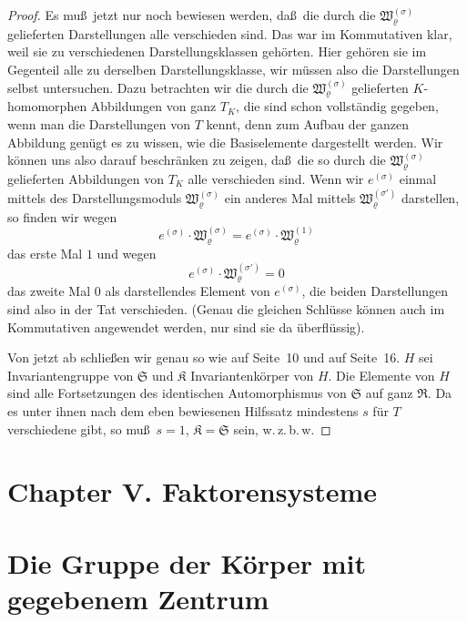 \documentclass[12pt,a4paper]{article}
\theoremstyle{plain}
\theoremstyle{definition}
\theoremstyle{remark}
\newcommand{\wzbw}{w.\,z.\,b.\,w.}
\begin{document}
\begin{proof}
Es mu\ss\ jetzt nur noch bewiesen werden, da\ss\ die durch die $\mathfrak{W}_{\varrho}^{(\sigma)}$
gelieferten Darstellungen alle verschieden sind. Das war im Kommutativen klar,
weil sie zu verschiedenen Darstellungsklassen geh\"orten. Hier geh\"oren sie im
Gegenteil alle zu derselben Darstellungsklasse, wir m\"ussen also die
Darstellungen selbst untersuchen. Dazu betrachten wir die durch die
$\mathfrak{W}_{\varrho}^{(\sigma)}$ gelieferten $K$-homomorphen Abbildungen von ganz $T_{K}$, die sind
schon vollst\"andig gegeben, wenn man die Darstellungen von $T$ kennt, denn zum
Aufbau der ganzen Abbildung gen\"ugt es zu wissen, wie die Basiselemente
dargestellt werden. Wir k\"onnen uns also darauf beschr\"anken zu zeigen, da\ss\ die
so durch die $\mathfrak{W}_{\varrho}^{(\sigma)}$ gelieferten Abbildungen von $T_{K}$ alle verschieden
sind. Wenn wir $e^{(\sigma)}$ einmal mittels des Darstellungsmoduls
$\mathfrak{W}_{\varrho}^{(\sigma)}$ ein anderes Mal mittels $\mathfrak{W}_{\varrho}^{(\sigma')}$ darstellen, so finden wir
wegen
\[
e^{(\sigma)} \cdot \mathfrak{W}_{\varrho}^{(\sigma)} = e^{(\sigma)} \cdot \mathfrak{W}_{\varrho}^{(1)}
\]
das erste Mal $1$ und wegen
\[
e^{(\sigma)} \cdot \mathfrak{W}_{\varrho}^{(\sigma')} = 0
\]
das zweite Mal $0$ als darstellendes Element von $e^{(\sigma)}$, die beiden
Darstellungen sind also in der Tat verschieden. (Genau die gleichen Schl\"usse
k\"onnen auch im Kommutativen angewendet werden, nur sind sie da \"uberfl\"ussig).

Von jetzt ab schlie\ss en wir genau so wie auf Seite~10 und auf Seite~16. $H$ sei
Invariantengruppe von $\mathfrak{S}$ und $\mathfrak{K}$ Invariantenk\"orper von $H$. Die Elemente
von $H$ sind alle Fortsetzungen des identischen Automorphismus von $\mathfrak{S}$ auf
ganz $\mathfrak{R}$. Da es unter ihnen nach dem eben bewiesenen Hilfssatz mindestens $s$
f\"ur $T$ verschiedene gibt, so mu\ss\ $s = 1$, $\mathfrak{K} = \mathfrak{S}$ sein, \wzbw
\end{proof}

\newpage
\section*{Chapter V. Faktorensysteme}

\section{Die Gruppe der K\"orper mit gegebenem Zentrum}\label{sec:22}
\end{document}
